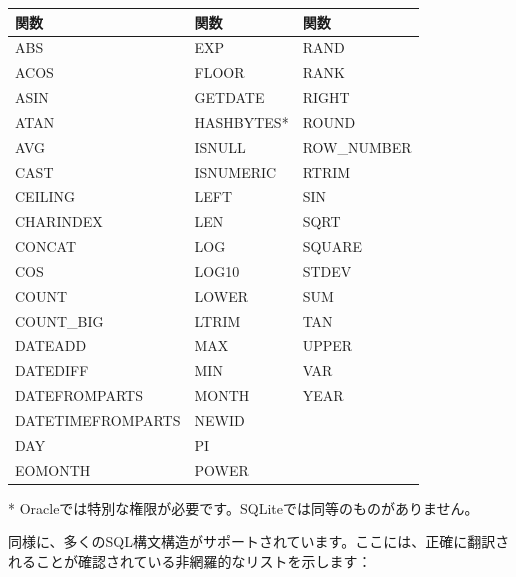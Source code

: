\documentclass[
  11pt]{book}
\theoremstyle{definition}
\theoremstyle{definition}
\theoremstyle{definition}
\theoremstyle{definition}
\theoremstyle{remark}
\begin{document}
\begin{longtable}[]{@{}lll@{}}
\toprule\noalign{}
関数 & 関数 & 関数 \\
\midrule\noalign{}
\endhead
\bottomrule\noalign{}
\endlastfoot
ABS & EXP & RAND \\
ACOS & FLOOR & RANK \\
ASIN & GETDATE & RIGHT \\
ATAN & HASHBYTES* & ROUND \\
AVG & ISNULL & ROW\_NUMBER \\
CAST & ISNUMERIC & RTRIM \\
CEILING & LEFT & SIN \\
CHARINDEX & LEN & SQRT \\
CONCAT & LOG & SQUARE \\
COS & LOG10 & STDEV \\
COUNT & LOWER & SUM \\
COUNT\_BIG & LTRIM & TAN \\
DATEADD & MAX & UPPER \\
DATEDIFF & MIN & VAR \\
DATEFROMPARTS & MONTH & YEAR \\
DATETIMEFROMPARTS & NEWID & \\
DAY & PI & \\
EOMONTH & POWER & \\
\end{longtable}

* Oracleでは特別な権限が必要です。SQLiteでは同等のものがありません。

同様に、多くのSQL構文構造がサポートされています。ここには、正確に翻訳されることが確認されている非網羅的なリストを示します：
\end{document}

